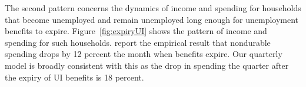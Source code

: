 \documentclass[\PathToRoot/\ProjectName]{subfiles}
\begin{document}
\whenintegrated{\label{ganong-noel}}

The second pattern concerns the dynamics of income and spending for households that become unemployed and remain unemployed long enough for unemployment benefits to expire.
Figure~\ref{fig:expiryUI} shows the pattern of income and spending for such households.
\cite{ganongConsumer2019} report the empirical result that nondurable spending drops by 12 percent the month when benefits expire.
Our quarterly model is broadly consistent with this as the drop in spending the quarter after the expiry of UI benefits is 18 percent.


\smartbib
\end{document}
